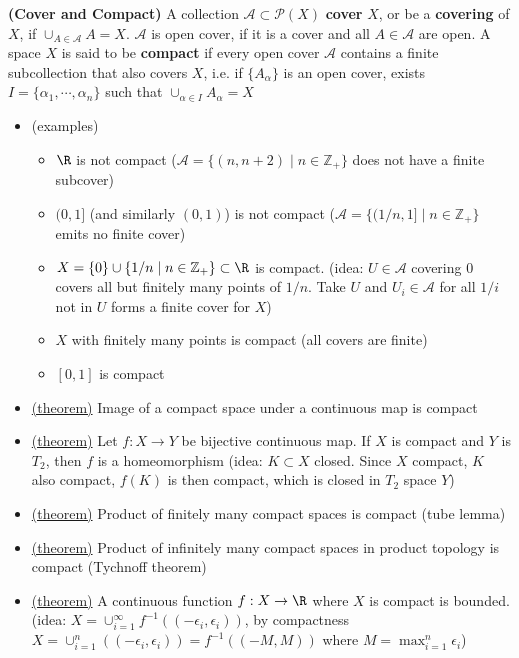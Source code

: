 \documentclass[10.5pt]{article}
\newcommand{\Z}{\mathbb{Z}}
\newcommand{\calA}{\mathcal{A}}
\newcommand{\calP}{\mathcal{P}}
\begin{document}
\begin{defn}
    \textbf{(Cover and Compact)} A collection $\calA \subset\calP(X)$ \textbf{cover} $X$, or be a \textbf{covering} of $X$, if $\textstyle \cup_{A\in \calA} A = X$. $\calA$ is open cover, if it is a cover and all $A\in \calA$ are open. A space $X$ is said to be \textbf{compact} if every open cover $\calA$ contains a finite subcollection that also covers $X$, i.e. if $\{A_{\alpha}\}$ is an open cover, exists $I = \{\alpha_1,\cdots,\alpha_n\}$ such that $\textstyle \cup_{\alpha\in I} A_{\alpha} = X$ 
    \begin{itemize}
        \item (examples)
        \begin{itemize}
            \item $\R$ is not compact ($\calA = \{(n, n+2) \mid n\in \Z_+\}$ does not have a finite subcover)
            \item $(0,1]$ (and similarly $(0,1)$) is not compact ($\calA = \{ (1/n,1]\mid n\in \Z_+\}$ emits no finite cover)
            \item $X = \{0\} \cup \{1/n \mid n\in \Z_+\} \subset \R$ is compact. (idea: $U \in \calA$ covering 0 covers all but finitely many points of $1/n$. Take $U$ and $U_{i}\in \calA$ for all $1/i$ not in $U$ forms a finite cover for $X$)
            \item $X$ with finitely many points is compact (all covers are finite)
            \item $[0,1]$ is compact 
        \end{itemize}
        \item \underline{(theorem)} Image of a compact space under a continuous map is compact
        \item \underline{(theorem)} Let $f:X\to Y$ be bijective continuous map. If $X$ is compact and $Y$ is $T_2$, then $f$ is a homeomorphism (idea: $K\subset X$ closed. Since $X$ compact, $K$ also compact, $f(K)$ is then compact, which is closed in $T_2$ space $Y$)
        \item \underline{(theorem)} Product of finitely many compact spaces is compact (tube lemma)
        \item \underline{(theorem)} Product of infinitely many compact spaces in product topology is compact (Tychnoff theorem)
        \item \underline{(theorem)} A continuous function $f:X\to \R$ where $X$ is compact is bounded. (idea: $X = \cup_{i=1}^{\infty} f^{-1}((-\epsilon_i,\epsilon_i))$, by compactness $X = \cup_{i=1}^n ((-\epsilon_i, \epsilon_i)) = f^{-1}((-M, M))$ where $M=\max_{i=1}^n \epsilon_i$)
    \end{itemize}
\end{defn}
\end{document}
